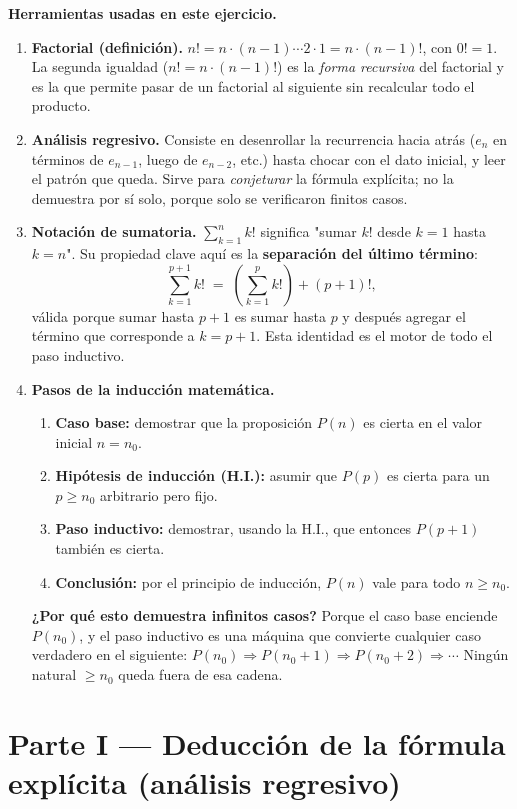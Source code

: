 \documentclass[11pt]{article}
\begin{document}
\begin{teo}
\textbf{Herramientas usadas en este ejercicio.}
\begin{enumerate}[leftmargin=*]
  \item \textbf{Factorial (definición).} $n! = n\cdot(n-1)\cdots 2\cdot 1 = n\cdot (n-1)!$, con $0!=1$. La segunda igualdad ($n!=n\cdot(n-1)!$) es la \emph{forma recursiva} del factorial y es la que permite pasar de un factorial al siguiente sin recalcular todo el producto.
  \item \textbf{Análisis regresivo.} Consiste en desenrollar la recurrencia hacia atrás ($e_n$ en términos de $e_{n-1}$, luego de $e_{n-2}$, etc.) hasta chocar con el dato inicial, y leer el patrón que queda. Sirve para \emph{conjeturar} la fórmula explícita; no la demuestra por sí solo, porque solo se verificaron finitos casos.
  \item \textbf{Notación de sumatoria.} $\displaystyle\sum_{k=1}^{n}k!$ significa "sumar $k!$ desde $k=1$ hasta $k=n$". Su propiedad clave aquí es la \textbf{separación del último término}:
  \[
    \sum_{k=1}^{p+1}k! \;=\; \left(\sum_{k=1}^{p}k!\right) + (p+1)! ,
  \]
  válida porque sumar hasta $p+1$ es sumar hasta $p$ y después agregar el término que corresponde a $k=p+1$. Esta identidad es el motor de todo el paso inductivo.
  \item \textbf{Pasos de la inducción matemática.}
  \begin{enumerate}[label=(\alph*)]
    \item \textbf{Caso base:} demostrar que la proposición $P(n)$ es cierta en el valor inicial $n=n_0$.
    \item \textbf{Hipótesis de inducción (H.I.):} asumir que $P(p)$ es cierta para un $p\ge n_0$ arbitrario pero fijo.
    \item \textbf{Paso inductivo:} demostrar, usando la H.I., que entonces $P(p+1)$ también es cierta.
    \item \textbf{Conclusión:} por el principio de inducción, $P(n)$ vale para todo $n\ge n_0$.
  \end{enumerate}
  \textbf{¿Por qué esto demuestra infinitos casos?} Porque el caso base enciende $P(n_0)$, y el paso inductivo es una máquina que convierte cualquier caso verdadero en el siguiente: $P(n_0)\Rightarrow P(n_0+1)\Rightarrow P(n_0+2)\Rightarrow\cdots$ Ningún natural $\ge n_0$ queda fuera de esa cadena.
  \end{enumerate}
\end{teo}

\newpage
\section*{Parte I --- Deducción de la fórmula explícita (análisis regresivo)}
\end{document}
